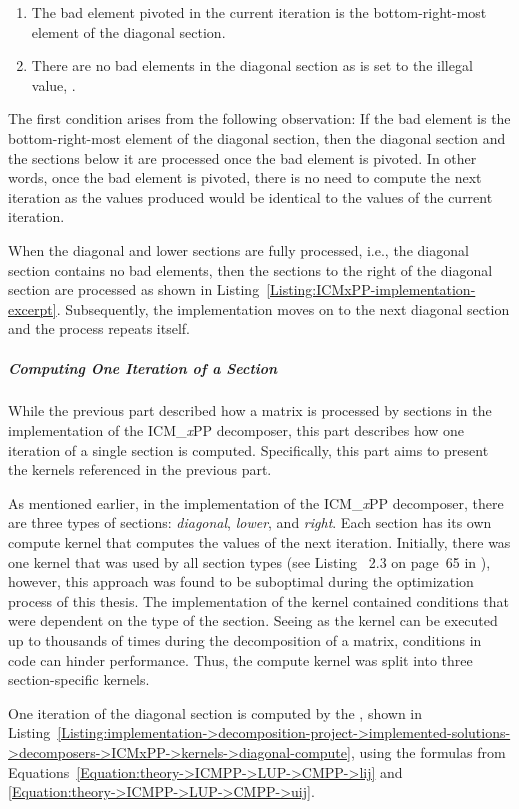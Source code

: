 \begin{enumerate}
	\item The bad element pivoted in the current iteration is the bottom-right-most element of the diagonal section.
	\item There are no bad elements in the diagonal section as  is set to the illegal value, .
\end{enumerate}

The first condition arises from the following observation: If the bad element is the bottom-right-most element of the diagonal section, then the diagonal section and the sections below it are processed once the bad element is pivoted. In other words, once the bad element is pivoted, there is no need to compute the next iteration as the values produced would be identical to the values of the current iteration.

When the diagonal and lower sections are fully processed, i.e., the diagonal section contains no bad elements, then the sections to the right of the diagonal section are processed as shown in Listing~\ref{Listing:ICMxPP-implementation-excerpt}. Subsequently, the implementation moves on to the next diagonal section and the process repeats itself.

\subparagraph{Computing One Iteration of a Section} While the previous part described how a matrix is processed by sections in the implementation of the ICM\_\textit{x}PP decomposer, this part describes how one iteration of a single section is computed. Specifically, this part aims to present the kernels referenced in the previous part.

As mentioned earlier, in the implementation of the ICM\_\textit{x}PP decomposer, there are three types of sections: \textit{diagonal}, \textit{lower}, and \textit{right}. Each section has its own compute kernel that computes the values of the next iteration. Initially, there was one kernel that was used by all section types (see Listing ~2.3 on page~65 in  \cite{Cejka2022}), however, this approach was found to be suboptimal during the optimization process of this thesis. The implementation of the kernel contained conditions that were dependent on the type of the section. Seeing as the kernel can be executed up to thousands of times during the decomposition of a matrix, conditions in code can hinder performance. Thus, the compute kernel was split into three section-specific kernels.

One iteration of the diagonal section is computed by the , shown in Listing~\ref{Listing:implementation->decomposition-project->implemented-solutions->decomposers->ICMxPP->kernels->diagonal-compute}, using the formulas from Equations~\ref{Equation:theory->ICMPP->LUP->CMPP->lij} and \ref{Equation:theory->ICMPP->LUP->CMPP->uij}.

